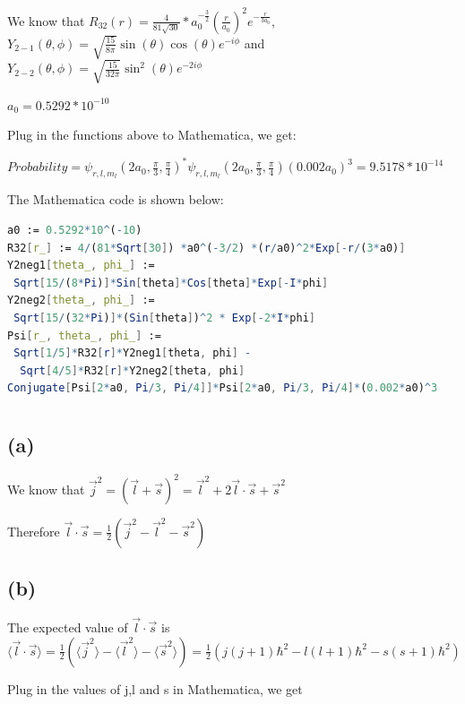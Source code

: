 \documentclass[12pt]{article}
\begin{document}
\begin{spacing}{2.0}
We know that $R_{32}(r)=\frac{4}{81\sqrt{30}}*a_0^{-\frac{3}{2}} \left(\frac{r}{a_0} \right)^2e^{-\frac{r}{3a_0}}$, $Y_{2-1}(\theta,\phi)=\sqrt{\frac{15}{8\pi}}\sin(\theta) \cos(\theta) e^{-i\phi}$ and $Y_{2-2}(\theta,\phi)= \sqrt{\frac{15}{32\pi}}\sin^2(\theta)e^{-2i\phi}$

$a_0=0.5292*10^{-10}$

Plug in the functions above to Mathematica, we get:

$Probability=\psi_{r,l,m_l}(2a_0, \frac{\pi}{3},\frac{\pi}{4})^* \psi_{r,l,m_l}(2a_0, \frac{\pi}{3},\frac{\pi}{4}) (0.002a_0)^3 = 9.5178*10^{-14}$

The Mathematica code is shown below:

\begin{lstlisting}[language=Mathematica,breaklines=true,frame=single]
a0 := 0.5292*10^(-10)
R32[r_] := 4/(81*Sqrt[30]) *a0^(-3/2) *(r/a0)^2*Exp[-r/(3*a0)]
Y2neg1[theta_, phi_] :=
 Sqrt[15/(8*Pi)]*Sin[theta]*Cos[theta]*Exp[-I*phi]
Y2neg2[theta_, phi_] :=
 Sqrt[15/(32*Pi)]*(Sin[theta])^2 * Exp[-2*I*phi]
Psi[r_, theta_, phi_] :=
 Sqrt[1/5]*R32[r]*Y2neg1[theta, phi] -
  Sqrt[4/5]*R32[r]*Y2neg2[theta, phi]
Conjugate[Psi[2*a0, Pi/3, Pi/4]]*Psi[2*a0, Pi/3, Pi/4]*(0.002*a0)^3
\end{lstlisting}

\section{} %

\subsection*{(a)}
We know that $\vec{j}^2= (\vec{l}+ \vec{s})^2= \vec{l}^2+ 2\vec{l} \cdot\vec{s} + \vec{s}^2$

Therefore $\vec{l} \cdot\vec{s}= \frac{1}{2} (\vec{j}^2 - \vec{l}^2- \vec{s}^2)$

\subsection*{(b)}

The expected value of $\vec{l} \cdot\vec{s}$ is $\langle \vec{l} \cdot\vec{s} \rangle= \frac{1}{2} (\langle \vec{j}^2\rangle - \langle \vec{l}^2\rangle- \langle \vec{s}^2\rangle) = \frac{1}{2}(j(j+1)\hbar^2 - l(l+1)\hbar^2 - s(s+1)\hbar^2) $

Plug in the values of j,l and s in Mathematica, we get


\end{spacing}
\end{document}
